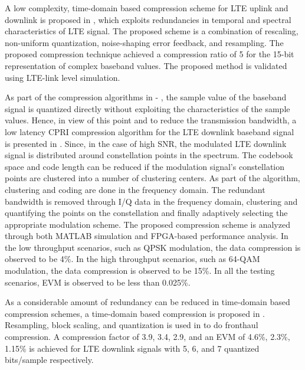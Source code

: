 \begin{multicols}{2}
\begin{itemize}
A low complexity, time-domain based compression scheme for LTE uplink and downlink is proposed in \cite{art3-key66}, which exploits redundancies in temporal and spectral characteristics of LTE signal. The proposed scheme is a combination of rescaling, non-uniform quantization, noise-shaping error feedback, and resampling. The proposed compression technique achieved a compression ratio of 5 for the 15-bit representation of complex baseband values. The proposed method is validated using LTE-link level simulation.

As part of the compression algorithms in \cite{art3-key67}- \cite{art3-key63}, the sample value of the baseband signal is quantized directly without exploiting the characteristics of the sample values. Hence, in view of this point and to reduce the transmission bandwidth, a low latency CPRI compression algorithm for the LTE downlink baseband signal is presented in \cite{art3-key68}. Since, in the case of high SNR, the modulated LTE downlink signal is distributed around constellation points in the spectrum. The codebook space and code length can be reduced if the modulation signal’s constellation points are clustered into a number of clustering centers. As part of the algorithm, clustering and coding are done in the frequency domain. The redundant bandwidth is removed through I/Q data in the frequency domain, clustering and quantifying the points on the constellation and finally adaptively selecting the appropriate modulation scheme. The proposed compression scheme is analyzed through both MATLAB simulation and FPGA-based performance analysis. In the low throughput scenarios, such as QPSK modulation, the data compression is observed to be 4\%. In the high throughput scenarios, such as 64-QAM modulation, the data compression is observed to be 15\%. In all the testing scenarios, EVM is observed to be less than 0.025\%.

As a considerable amount of redundancy can be reduced in time-domain based compression schemes, a time-domain based compression is proposed in \cite{art3-key69}. Resampling, block scaling, and quantization is used in \cite{art3-key69} to do fronthaul compression. A compression factor of 3.9, 3.4, 2.9, and an EVM of 4.6\%, 2.3\%, 1.15\% is achieved for LTE downlink signals with 5, 6, and 7 quantized bits/sample respectively.


\end{itemize}
\end{multicols}
